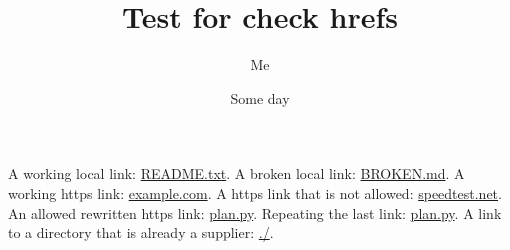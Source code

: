 \documentclass{article}
\title{Test for check hrefs}
\author{Me}
\date{Some day}
\begin{document}
    \maketitle
    A working local link: \href{README.txt}{README.txt}.
    A broken local link: \href{BROKEN.md}{BROKEN.md}.
    A working https link: \href{https://www.iana.org/help/example-domains}{example.com}.
    A https link that is not allowed: \href{https://www.speedtest.net/}{speedtest.net}.
    An allowed rewritten https link: \href{https://users.ugent.be/~tovrstra/plan.py}{plan.py}.
    Repeating the last link: \href{https://users.ugent.be/~tovrstra/plan.py}{plan.py}.
    A link to a directory that is already a supplier: \href{https://users.ugent.be/~tovrstra/}{./}.
\end{document}

